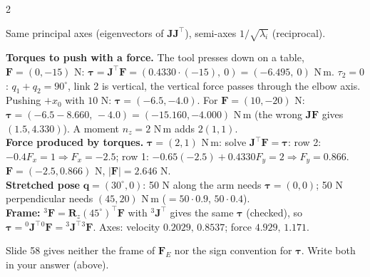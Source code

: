 \begin{multicols}{2}
\begin{fbx}
Same principal axes (eigenvectors of $\mathbf J\mathbf J^\top$), semi-axes $1/\sqrt{\lambda_i}$ (reciprocal). 
\end{fbx}
\begin{worked}[$L=(0.5,0.4)$ m, $\mathbf q=(30^\circ,60^\circ)$; $\mathbf J_{xy}=\begin{bmatrix}-0.65&-0.4\\0.4330&0\end{bmatrix}$, $\mathbf J^\top=\begin{bmatrix}-0.65&0.4330\\-0.4&0\end{bmatrix}$]
\textbf{Torques to push with a force.} The tool presses down on a table, $\mathbf F=(0,-15)$ N: $\boldsymbol\tau=\mathbf J^\top\mathbf F=(0.4330\cdot(-15),\ 0)=(-6.495,\ 0)$ N\,m. $\tau_2=0$: $q_1+q_2=90^\circ$, link 2 is vertical, the vertical force passes through the elbow axis. Pushing $+x_0$ with $10$ N: $\boldsymbol\tau=(-6.5,-4.0)$. For $\mathbf F=(10,-20)$ N: $\boldsymbol\tau=(-6.5-8.660,\,-4.0)=(-15.160,-4.000)$ N\,m (the wrong $\mathbf J\mathbf F$ gives $(1.5,4.330)$). A moment $n_z=2$ N\,m adds $2(1,1)$.\\
\textbf{Force produced by torques.} $\boldsymbol\tau=(2,1)$ N\,m: solve $\mathbf J^\top\mathbf F=\boldsymbol\tau$: row 2: $-0.4F_x=1\Rightarrow F_x=-2.5$; row 1: $-0.65(-2.5)+0.4330F_y=2\Rightarrow F_y=0.866$. $\mathbf F=(-2.5,0.866)$ N, $|\mathbf F|=2.646$ N.\\
\textbf{Stretched pose} $\mathbf q=(30^\circ,0)$: 50 N along the arm needs $\boldsymbol\tau=(0,0)$; 50 N perpendicular needs $(45,20)$ N\,m ($=50\cdot0.9$, $50\cdot0.4$).\\
\textbf{Frame:} ${}^3\mathbf F=\mathbf R_z(45^\circ)^\top\mathbf F$ with ${}^3\mathbf J^\top$ gives the same $\boldsymbol\tau$ (checked), so $\boldsymbol\tau={}^0\mathbf J^\top{}^0\mathbf F={}^3\mathbf J^\top{}^3\mathbf F$. Axes: velocity $0.2029,\,0.8537$; force $4.929,\,1.171$. \chk
\end{worked}
\begin{slideerr}[slide 58]
Slide 58 gives neither the frame of $\mathbf F_E$ nor the sign convention for $\boldsymbol\tau$. Write both in your answer (above).

\end{slideerr}
\end{multicols}
